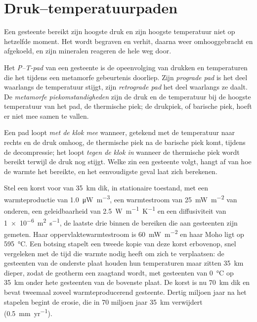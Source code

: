 \section{Druk--temperatuurpaden}\label{sec:b2:pt-paths:paths}

Een gesteente bereikt zijn hoogste druk en zijn hoogste temperatuur niet op hetzelfde moment.
Het wordt begraven en verhit, daarna weer omhooggebracht en afgekoeld, en zijn mineralen reageren de hele
weg door.

\begin{definition}\label{def:b2:pt-paths:paths}
Het \emph{P--T-pad} van een gesteente is de opeenvolging van drukken en
temperaturen die het tijdens een metamorfe gebeurtenis doorliep. Zijn \emph{prograde
pad} is het deel waarlangs de temperatuur stijgt, zijn \emph{retrograde
pad} het deel waarlangs ze daalt. De \emph{metamorfe
piekomstandigheden} zijn de druk en de temperatuur bij de
hoogste temperatuur van het pad, de thermische piek; de drukpiek, of barische piek, hoeft
er niet mee samen te vallen.
\end{definition}

Een pad loopt \emph{met de klok mee} wanneer, getekend met de temperatuur naar rechts en de druk omhoog,
de thermische piek na de barische piek komt, tijdens de decompressie; het loopt
\emph{tegen de klok in} wanneer de thermische piek wordt bereikt terwijl de druk nog stijgt. Welke
zin een gesteente volgt, hangt af van hoe de warmte het bereikte, en het eenvoudigste geval laat zich
berekenen.

Stel een korst voor van \qty{35}{km} dik, in stationaire toestand, met een warmteproductie van
\qty{1.0}{\micro W.m^{-3}}, een warmtestroom van \qty{25}{mW.m^{-2}} van onderen, een geleidbaarheid
van \qty{2.5}{W.m^{-1}.K^{-1}} en een diffusiviteit van \qty{1e-6}{m^2.s^{-1}}, de laatste drie
binnen de bereiken die aan gesteenten zijn gemeten. Haar oppervlaktewarmtestroom is \qty{60}{mW.m^{-2}} en haar Moho ligt op
\qty{595}{\celsius}. Een botsing stapelt een tweede kopie van deze korst erbovenop, snel
vergeleken met de tijd die warmte nodig heeft om zich te verplaatsen: de gesteenten van de onderste plaat houden hun
temperaturen maar zitten \qty{35}{km} dieper, zodat de geotherm een zaagtand wordt, met
gesteenten van \qty{0}{\celsius} op \qty{35}{km} onder hete gesteenten van de bovenste plaat. De korst is
nu \qty{70}{km} dik en bevat tweemaal zoveel warmteproducerend gesteente. Dertig miljoen jaar na
het stapelen begint de erosie, die in 70 miljoen jaar \qty{35}{km} verwijdert
(\qty{0.5}{mm.yr^{-1}}).


